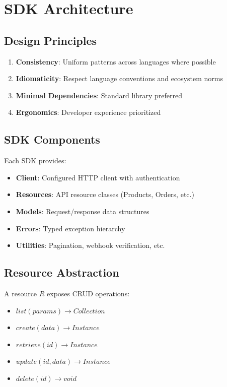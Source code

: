 \section{SDK Architecture}


\subsection{Design Principles}

\begin{enumerate}
    \item \textbf{Consistency}: Uniform patterns across languages where possible
    \item \textbf{Idiomaticity}: Respect language conventions and ecosystem norms
    \item \textbf{Minimal Dependencies}: Standard library preferred
    \item \textbf{Ergonomics}: Developer experience prioritized
\end{enumerate}

\subsection{SDK Components}

Each SDK provides:

\begin{itemize}
    \item \textbf{Client}: Configured HTTP client with authentication
    \item \textbf{Resources}: API resource classes (Products, Orders, etc.)
    \item \textbf{Models}: Request/response data structures
    \item \textbf{Errors}: Typed exception hierarchy
    \item \textbf{Utilities}: Pagination, webhook verification, etc.
\end{itemize}

\subsection{Resource Abstraction}

\begin{definition}
A resource $R$ exposes CRUD operations:
\begin{itemize}
    \item $list(params) \rightarrow Collection$
    \item $create(data) \rightarrow Instance$
    \item $retrieve(id) \rightarrow Instance$
    \item $update(id, data) \rightarrow Instance$
    \item $delete(id) \rightarrow void$
\end{itemize}
\end{definition}


